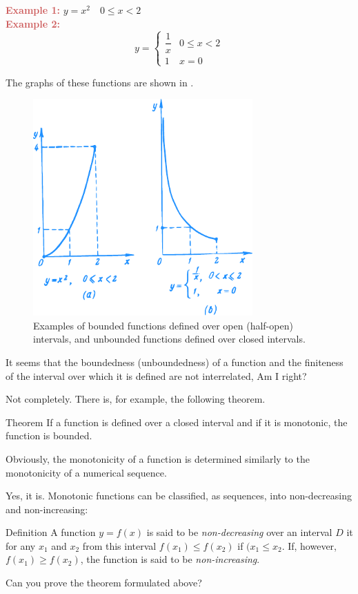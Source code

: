 {\textcolor{IndianRed}{\textbf{Example 1:}}  $y= x^{2}  \quad 0 \leqslant x< 2$ \\
\textcolor{IndianRed}{\textbf{Example 2:}}  
\begin{equation*}%
y = 
\begin{cases}
 \dfrac{1}{x} &  0 \leqslant x< 2\\
 1 & x =0
\end{cases}
\end{equation*}

The graphs of these functions are shown in . 
\begin{figure}[!h]
\centering
\includegraphics[width=0.75\textwidth,angle=-1]{figures/fig-16.pdf}
\caption{Examples of bounded functions defined over open (half-open) intervals, and unbounded functions defined over closed intervals.}
\label{fig-16}
\end{figure}

\rdr It seems that the boundedness (unboundedness) of a function and the finiteness of the interval over which it is defined are not interrelated, Am I right?

\athr Not completely. There is, for example, the following theorem.
\begin{mytheo}{Theorem}
If a function is defined over a closed interval and if it is monotonic, the function is bounded.
\end{mytheo}
\rdr Obviously, the monotonicity of a function is determined similarly to the monotonicity of a numerical sequence.

\athr Yes, it is. Monotonic functions can be classified, as sequences, into non-decreasing and non-increasing:
\begin{mytheo}{Definition}
\label{monotonic-def}
A function $y = f (x)$ is said to be \emph{non-decreasing} over an interval $D$ it for any $x_{1}$ and $x_{2}$ from this interval $f(x_{1}) \leqslant 
 f(x_{2})$ if $(x_{1} \leqslant  x_{2}$.  If, however, $f(x_{1}) \geqslant 
 f(x_{2})$, the function is said to be \emph{non-increasing}.
\end{mytheo}
Can you prove the theorem formulated above? 

}
